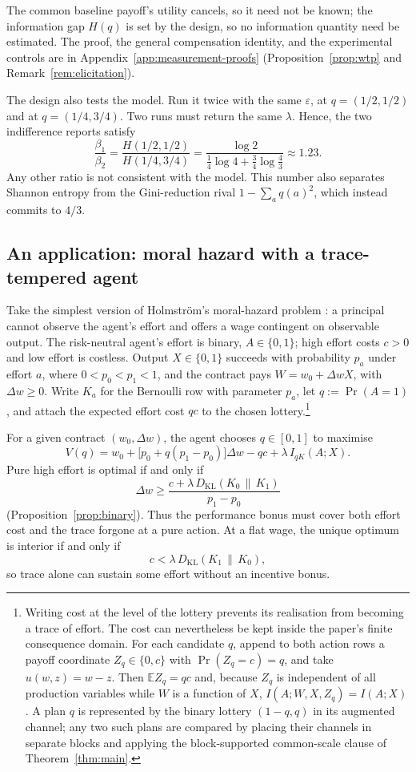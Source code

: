 \documentclass[11pt,a4paper]{article}
\theoremstyle{definition}
\newcommand{\E}{\mathbb E}
\newcommand{\I}{I}
\newcommand{\Sh}{H}
\newcommand{\KL}{D_{\mathrm{KL}}}
\newcommand{\1}{\mathbf 1}
\begin{document}
The common baseline payoff's utility cancels, so it need not be known; the information gap $\Sh(q)$ is set by
the design, so no information quantity need be estimated.  The proof, the general compensation identity, and
the experimental controls are in Appendix~\ref{app:measurement-proofs} (Proposition~\ref{prop:wtp} and
Remark~\ref{rem:elicitation}).

The design also tests the model.  Run it twice with the same $\varepsilon$, at $q=(1/2,1/2)$ and at
$q=(1/4,3/4)$.  Two runs must return the same $\lambda$. Hence, the two indifference
reports satisfy
\[
 \frac{\beta_1}{\beta_2}
 =\frac{\Sh(1/2,1/2)}{\Sh(1/4,3/4)}
 =\frac{\log 2}{\frac14\log4+\frac34\log\frac43}
 \approx1.23.
\]
 Any other ratio is not consistent with 
the model.  This number also separates Shannon entropy from the Gini-reduction rival
$1-\sum_aq(a)^2$, which instead commits to $4/3$.


\subsection{An application: moral hazard with a trace-tempered agent}\label{sec:application}
Take the simplest version of Holmstr\"om's moral-hazard problem \cite{Holmstrom1979}: a principal cannot observe
the agent's effort and offers a wage contingent on observable output.  The risk-neutral agent's effort is binary,
$A\in\{0,1\}$; high effort costs $c>0$ and low effort is costless.  Output $X\in\{0,1\}$ succeeds with
probability $p_a$ under effort $a$, where $0<p_0<p_1<1$, and the contract pays $W=w_0+\Delta wX$, with
$\Delta w\ge0$.  Write
$K_a$ for the Bernoulli row with parameter $p_a$, let $q:=\Pr(A=1)$, and attach the expected effort cost
$qc$ to the chosen lottery.\footnote{Writing cost at the level of the lottery prevents its realisation
from becoming a trace of effort.  The cost can nevertheless be kept inside the paper's finite consequence
domain.  For each candidate $q$, append to both action rows a payoff coordinate
$Z_q\in\{0,c\}$ with $\Pr(Z_q=c)=q$, and take $u(w,z)=w-z$.  Then $\E Z_q=qc$ and, because $Z_q$ is
independent of all production variables while $W$ is a function of $X$,
$\I(A;W,X,Z_q)=\I(A;X)$.  A plan $q$ is represented by the binary lottery $(1-q,q)$ in its augmented channel; any two
such plans are compared by placing their channels in separate blocks and applying the block-supported
common-scale clause of Theorem~\ref{thm:main}.}  

For a given contract $(w_0, \Delta w)$,  the agent chooses $q\in[0,1]$ to maximise
\[
 V(q)=w_0+\bigl[p_0+q(p_1-p_0)\bigr]\Delta w-qc
      +\lambda\,\I_{qK}(A;X).
\]
Pure high effort is optimal if and only if
\[
 \Delta w\ge \frac{c+\lambda\,\KL(K_0\,\|\,K_1)}{p_1-p_0}
\]
(Proposition~\ref{prop:binary}).  Thus the performance bonus must cover both effort cost and the trace forgone
at a pure action.  At a flat wage, the unique optimum is interior if and only if
\[
 c<\lambda\,\KL(K_1\,\|\,K_0),
\]
so trace alone can sustain some effort without an incentive bonus.
\end{document}
